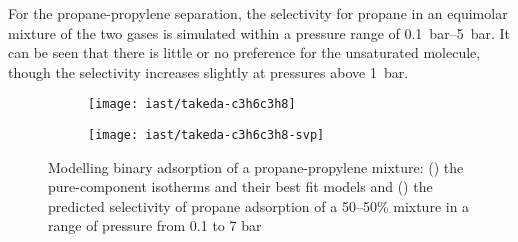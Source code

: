 For the propane-propylene separation, the selectivity for
propane in an equimolar mixture of the two gases is simulated within
a pressure range of \SIrange{0.1}{5}{\bar}. 
It can be seen that there is little or no preference for the 
unsaturated molecule, though the selectivity increases slightly at 
pressures above \SI{1}{\bar}.

\begin{figure}[htb]

    \centering
    \begin{subfigure}[b]{.42\textwidth}
        \texttt{[image: iast/takeda-c3h6c3h8]}
        \caption{}%
        \label{pyg:fig:takedac3h6c3h8iso}
    \end{subfigure}
    \begin{subfigure}[b]{.4\textwidth}
        \texttt{[image: iast/takeda-c3h6c3h8-svp]}
        \caption{}%
        \label{pyg:fig:takedac3h6c3h8iast}
    \end{subfigure}
    \caption{%
    Modelling binary adsorption of a propane-propylene mixture: 
    (\protect{}) the pure-component
    isotherms and their best fit models and 
    (\protect{})
    the predicted selectivity of propane adsorption 
    of a 50--50\% mixture in a range of pressure from 0.1 to 7 bar}%
    \label{pyg:fig:takedac3h6c3h8}

\end{figure}